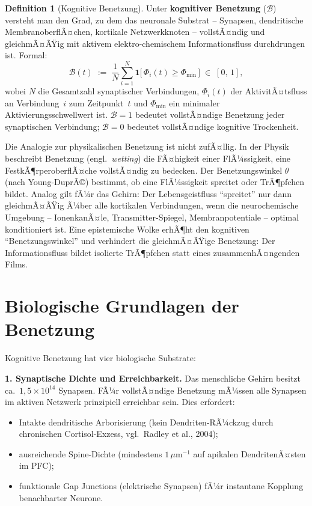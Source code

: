 ﻿\documentclass[12pt,a4paper]{report}
\theoremstyle{plain}
\theoremstyle{definition}
\newtheorem{definition}[theorem]{Definition}
\theoremstyle{remark}
\begin{document}
	\begin{definition}[Kognitive Benetzung]
		\label{def:benetzung}
		Unter \textbf{kognitiver Benetzung} ($\mathcal{B}$) versteht man den Grad,
		zu dem das neuronale Substrat -- Synapsen, dendritische MembranoberflÃ¤chen,
		kortikale Netzwerkknoten -- vollstÃ¤ndig und gleichmÃ¤ÃŸig mit aktivem
		elektro-chemischem Informationsfluss durchdrungen ist.
		Formal:
		\[
		\mathcal{B}(t) \;:=\; \frac{1}{N}\sum_{i=1}^{N}
		\mathbf{1}\bigl[\,\Phi_i(t) \geq \Phi_{\min}\,\bigr]
		\;\in\; [0,\,1],
		\]
		wobei $N$ die Gesamtzahl synaptischer Verbindungen,
		$\Phi_i(t)$ der AktivitÃ¤tsfluss an Verbindung~$i$ zum Zeitpunkt~$t$
		und $\Phi_{\min}$ ein minimaler Aktivierungsschwellwert ist.
		$\mathcal{B} = 1$ bedeutet vollstÃ¤ndige Benetzung jeder synaptischen
		Verbindung; $\mathcal{B} = 0$ bedeutet vollstÃ¤ndige kognitive Trockenheit.
	\end{definition}

	Die Analogie zur physikalischen Benetzung ist nicht zufÃ¤llig.
	In der Physik beschreibt Benetzung (engl.\ \textit{wetting}) die FÃ¤higkeit
	einer FlÃ¼ssigkeit, eine FestkÃ¶rperoberflÃ¤che vollstÃ¤ndig zu bedecken.
	Der Benetzungswinkel $\theta$ (nach Young-DuprÃ©) bestimmt, ob eine
	FlÃ¼ssigkeit spreitet oder TrÃ¶pfchen bildet. Analog gilt fÃ¼r das Gehirn:
	Der Lebensgeistfluss ``spreitet'' nur dann gleichmÃ¤ÃŸig Ã¼ber alle
	kortikalen Verbindungen, wenn die neurochemische Umgebung -- IonenkanÃ¤le,
	Transmitter-Spiegel, Membranpotentiale -- optimal konditioniert ist.
	Eine epistemische Wolke erhÃ¶ht den kognitiven ``Benetzungswinkel''
	und verhindert die gleichmÃ¤ÃŸige Benetzung: Der Informationsfluss
	bildet isolierte TrÃ¶pfchen statt eines zusammenhÃ¤ngenden Films.

	\section{Biologische Grundlagen der Benetzung}

	Kognitive Benetzung hat vier biologische Substrate:

	\textbf{1. Synaptische Dichte und Erreichbarkeit.}
	Das menschliche Gehirn besitzt ca.\ $1{,}5 \times 10^{14}$ Synapsen.
	FÃ¼r vollstÃ¤ndige Benetzung mÃ¼ssen alle Synapsen im aktiven Netzwerk
	prinzipiell erreichbar sein. Dies erfordert:
	\begin{itemize}
		\item Intakte dendritische Arborisierung (kein Dendriten-RÃ¼ckzug durch
		chronischen Corti\-sol-Exzess, vgl.\ Radley et al., 2004);
		\item ausreichende Spine-Dichte (mindestens $1\,\mu\mathrm{m}^{-1}$
		auf apikalen DendritenÃ¤sten im PFC);
		\item funktionale Gap Junctions (elektrische Synapsen) fÃ¼r
		instantane Kopplung benachbarter Neurone.
	\end{itemize}
\end{document}
